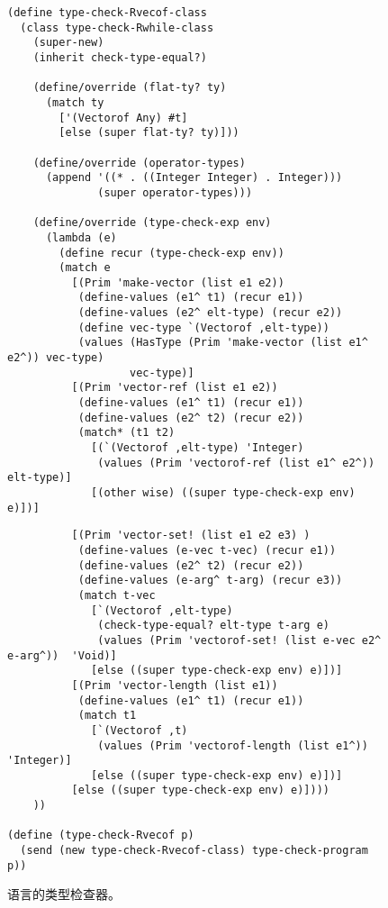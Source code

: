 \documentclass[11pt]{book}
\begin{document}
\begin{figure}[tbp]
\begin{lstlisting}
(define type-check-Rvecof-class
  (class type-check-Rwhile-class
    (super-new)
    (inherit check-type-equal?)

    (define/override (flat-ty? ty)
      (match ty
        ['(Vectorof Any) #t]
        [else (super flat-ty? ty)]))
    
    (define/override (operator-types)
      (append '((* . ((Integer Integer) . Integer)))
              (super operator-types)))
    
    (define/override (type-check-exp env)
      (lambda (e)
        (define recur (type-check-exp env))
        (match e
          [(Prim 'make-vector (list e1 e2))
           (define-values (e1^ t1) (recur e1))
           (define-values (e2^ elt-type) (recur e2))
           (define vec-type `(Vectorof ,elt-type))
           (values (HasType (Prim 'make-vector (list e1^ e2^)) vec-type)
                   vec-type)]
          [(Prim 'vector-ref (list e1 e2))
           (define-values (e1^ t1) (recur e1))
           (define-values (e2^ t2) (recur e2))
           (match* (t1 t2)
             [(`(Vectorof ,elt-type) 'Integer)
              (values (Prim 'vectorof-ref (list e1^ e2^)) elt-type)]
             [(other wise) ((super type-check-exp env) e)])]
\end{lstlisting}
\end{figure}
\begin{figure}[tbp]
\begin{lstlisting}             
          [(Prim 'vector-set! (list e1 e2 e3) )
           (define-values (e-vec t-vec) (recur e1))
           (define-values (e2^ t2) (recur e2))
           (define-values (e-arg^ t-arg) (recur e3))
           (match t-vec
             [`(Vectorof ,elt-type)
              (check-type-equal? elt-type t-arg e)
              (values (Prim 'vectorof-set! (list e-vec e2^ e-arg^))  'Void)]
             [else ((super type-check-exp env) e)])]
          [(Prim 'vector-length (list e1))
           (define-values (e1^ t1) (recur e1))
           (match t1
             [`(Vectorof ,t)
              (values (Prim 'vectorof-length (list e1^))  'Integer)]
             [else ((super type-check-exp env) e)])]
          [else ((super type-check-exp env) e)])))
    ))

(define (type-check-Rvecof p)
  (send (new type-check-Rvecof-class) type-check-program p))
\end{lstlisting}
\caption{ \LangArray{} 语言的类型检查器。}
\label{fig:type-check-Rvecof}
\end{figure}
\end{document}
